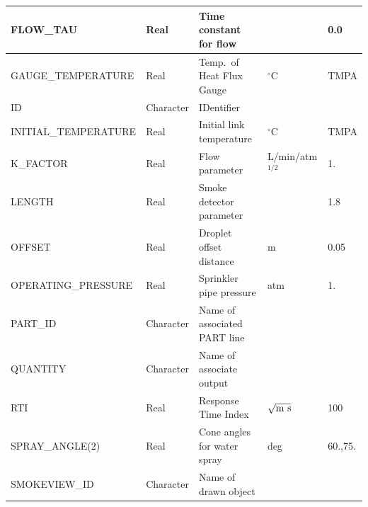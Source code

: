\documentclass[11pt]{book}
\begin{document}
\begin{table}[H]
\begin{tabular*}{\textwidth}{@{\extracolsep{\fill}}|l|l|l|l|l|}
{\ct FLOW\_TAU}                         & Real          & Time constant for flow           &                       & 0.0       \\ \hline
{\ct GAUGE\_TEMPERATURE}                & Real          & Temp.~of Heat Flux Gauge         & $^\circ$C             & {\ct TMPA}\\ \hline
{\ct ID}                                & Character     & IDentifier                       &                       &           \\ \hline
{\ct INITIAL\_TEMPERATURE}              & Real          & Initial link temperature         & $^\circ$C             & {\ct TMPA}\\ \hline
{\ct K\_FACTOR}                         & Real          & Flow parameter                   & L/min/atm$^{1/2}$     & 1.        \\ \hline
{\ct LENGTH}                            & Real          & Smoke detector parameter         &                       & 1.8       \\ \hline
{\ct OFFSET}                            & Real          & Droplet offset distance          & m                     & 0.05      \\ \hline
{\ct OPERATING\_PRESSURE}               & Real          & Sprinkler pipe pressure          & atm                   & 1.        \\ \hline
{\ct PART\_ID}                          & Character     & Name of associated PART line     &                       &           \\ \hline
{\ct QUANTITY}                          & Character     & Name of associate output         &                       &           \\ \hline
{\ct RTI}                               & Real          & Response Time Index              & $\sqrt{\hbox{m~s}}$   & 100       \\ \hline
{\ct SPRAY\_ANGLE(2)}                   & Real          & Cone angles for water spray      & deg                   & 60.,75.   \\ \hline
{\ct SMOKEVIEW\_ID}                     & Character     & Name of drawn object             &                       &           \\ \hline
\end{tabular*}
\end{table}

\vspace{\baselineskip}

\vfill
\end{document}
